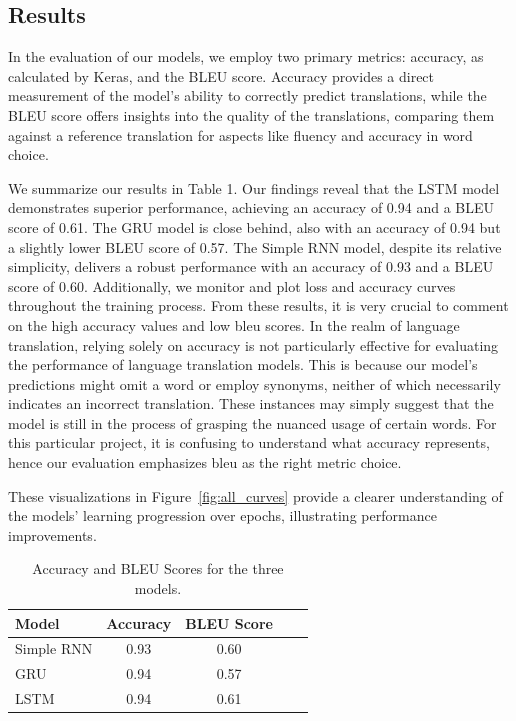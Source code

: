 \documentclass{article}
\begin{document}
\subsection{Results}

In the evaluation of our models, we employ two primary metrics: accuracy, as calculated by Keras, and the BLEU score. Accuracy provides a direct measurement of the model's ability to correctly predict translations, while the BLEU score offers insights into the quality of the translations, comparing them against a reference translation for aspects like fluency and accuracy in word choice.

We summarize our results in Table 1. Our findings reveal that the LSTM model demonstrates superior performance, achieving an accuracy of 0.94 and a BLEU score of 0.61. The GRU model is close behind, also with an accuracy of 0.94 but a slightly lower BLEU score of 0.57. The Simple RNN model, despite its relative simplicity, delivers a robust performance with an accuracy of 0.93 and a BLEU score of 0.60. Additionally, we monitor and plot loss and accuracy curves throughout the training process. From these results, it is very crucial to comment on the high accuracy values and low bleu scores. In the realm of language translation, relying solely on accuracy is not particularly effective for evaluating the performance of language translation models. This is because our model's predictions might omit a word or employ synonyms, neither of which necessarily indicates an incorrect translation. These instances may simply suggest that the model is still in the process of grasping the nuanced usage of certain words. 
For this particular project, it is confusing to understand what accuracy
represents, hence our evaluation emphasizes bleu as the right metric choice.

These visualizations in Figure~\ref{fig:all_curves} provide a clearer understanding of the models' learning progression over epochs, illustrating performance improvements.



\begin{table}[t]
\caption{Accuracy and BLEU Scores for the three models.}
\label{sample-table}
\vskip 0.15in
\begin{center}
\begin{small}
\begin{sc}
\begin{tabular}{lcccr}
\hline
\abovespace\belowspace
Model & Accuracy & BLEU Score \\
\hline
\abovespace
Simple RNN    & 0.93& 0.60 \\
GRU & 0.94& 0.57\\


\belowspace
LSTM   & 0.94&0.61 \\
\hline
\end{tabular}
\end{sc}
\end{small}
\end{center}
\vskip -0.1in
\end{table}
\end{document}
